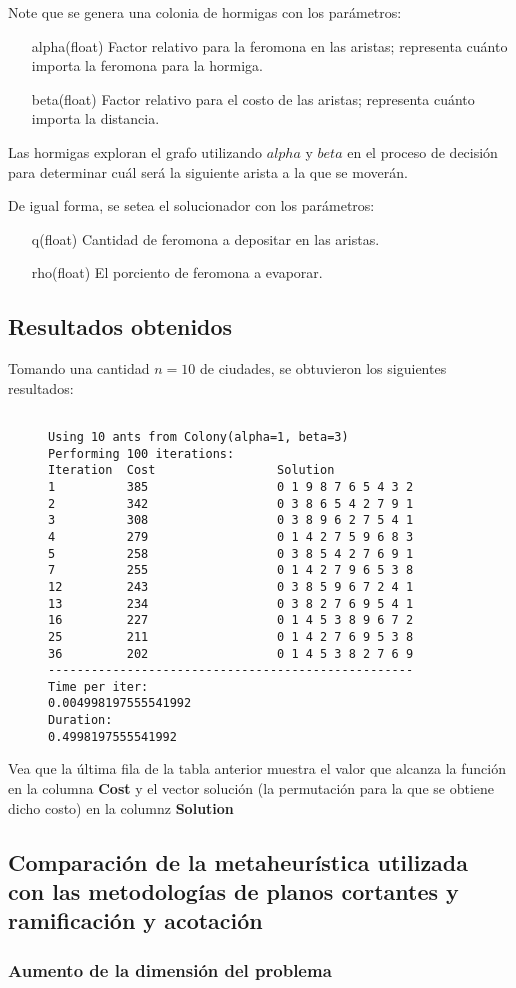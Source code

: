 \documentclass[titlepage, 11pt]{scrartcl}
\begin{document}
 				Note que se genera una colonia de hormigas con los parámetros:
 				\begin{itemize}
 					\item[alpha(float)] Factor relativo para la feromona en las aristas; representa cuánto importa la feromona para la hormiga.
 					\item[beta(float)] Factor relativo para el costo de las aristas; representa cuánto importa la distancia.
 				\end{itemize}
 				Las hormigas exploran el grafo utilizando $alpha$ y $beta$ en el proceso de decisión para determinar cuál será la siguiente arista a la que se moverán.
 				
 				De igual forma, se setea el solucionador con los parámetros:
 				\begin{itemize}
 					\item[q(float)] Cantidad de feromona a depositar en las aristas.
 					\item[rho(float)] El porciento de feromona a evaporar.
 				\end{itemize}
 		
 		\subsection{Resultados obtenidos}
 		Tomando una cantidad $n = 10$ de ciudades, se obtuvieron los siguientes resultados:
		\begin{figure}[H]
			\begin{verbatim}

Using 10 ants from Colony(alpha=1, beta=3)
Performing 100 iterations:
Iteration  Cost                 Solution
1          385                  0 1 9 8 7 6 5 4 3 2
2          342                  0 3 8 6 5 4 2 7 9 1
3          308                  0 3 8 9 6 2 7 5 4 1
4          279                  0 1 4 2 7 5 9 6 8 3
5          258                  0 3 8 5 4 2 7 6 9 1
7          255                  0 1 4 2 7 9 6 5 3 8
12         243                  0 3 8 5 9 6 7 2 4 1
13         234                  0 3 8 2 7 6 9 5 4 1
16         227                  0 1 4 5 3 8 9 6 7 2
25         211                  0 1 4 2 7 6 9 5 3 8
36         202                  0 1 4 5 3 8 2 7 6 9
---------------------------------------------------
Time per iter:
0.004998197555541992
Duration:
0.4998197555541992

			\end{verbatim}
		\end{figure}
		Vea que la última fila de la tabla anterior muestra el valor que alcanza la función en la columna \textbf{Cost} y el vector solución (la permutación para la que se obtiene dicho costo) en la columnz \textbf{Solution}
 		
 		\subsection{Comparación de la metaheurística utilizada con las metodologías de planos cortantes y ramificación y acotación}
 		
 			\subsubsection{Aumento de la dimensión del problema}
 		
\end{document}
